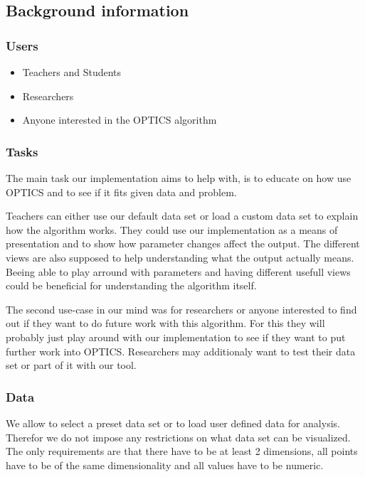 \documentclass{vgtc}                          %
\begin{document}
\subsection{Background information}
\subsubsection{Users}
\begin{itemize}
\item Teachers and Students
\item Researchers
\item Anyone interested in the OPTICS algorithm
\end{itemize}
\subsubsection{Tasks}
\begin{flushleft}
The main task our implementation aims to help with, is to educate on how use OPTICS and to see if it fits given data and problem.
\end{flushleft}

\begin{flushleft}
Teachers can either use our default data set or load a custom data set to explain how the algorithm works. They could use our implementation as a means of presentation and to show how parameter changes affect the output. The different views are also supposed to help understanding what the output actually means. Beeing able to play arround with parameters and having different usefull views could be beneficial for understanding the algorithm itself.
\end{flushleft}

\begin{flushleft}
The second use-case in our mind was for researchers or anyone interested to find out if they want to do future work with this algorithm. For this they will probably just play around with our implementation to see if they want to put further work into OPTICS. Researchers may additionaly want to test their data set or part of it with our tool.
\end{flushleft}

\subsubsection{Data}
We allow to select a preset data set or to load user defined data for analysis. Therefor we do not impose any restrictions on what data set can be visualized. The only requirements are that there have to be at least 2 dimensions, all points have to be of the same dimensionality and all values have to be numeric.
\end{document}
